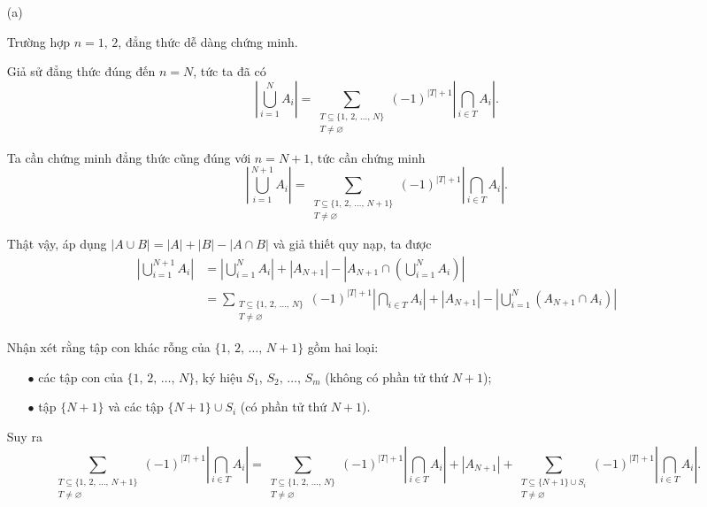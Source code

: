 \begin{enumerate}
    \item[(a)] {
        Trường hợp $n = 1,\,2$, đẳng thức dễ dàng chứng minh.

        Giả sử đẳng thức đúng đến $n = N$, tức ta đã có $$\left|\bigcup\limits_{i = 1}^N A_i\right| = \sum\limits_{\substack{T \subseteq \{1,\,2,\,\ldots,\,N\} \\ T \ne \varnothing}} (-1)^{|T| + 1} \left|\bigcap\limits_{i \in T} A_i\right|.$$

        Ta cần chứng minh đẳng thức cũng đúng với $n = N + 1$, tức cần chứng minh $$\left|\bigcup\limits_{i = 1}^{N+1} A_i\right| = \sum\limits_{\substack{T \subseteq \{1,\,2,\,\ldots,\,N+1\} \\ T \ne \varnothing}} (-1)^{|T| + 1} \left|\bigcap\limits_{i \in T} A_i\right|.$$

        Thật vậy, áp dụng $|A \cup B| = |A| + |B| - |A \cap B|$ và giả thiết quy nạp, ta được
        \begin{align*}
            \left|\bigcup\limits_{i = 1}^{N+1} A_i\right|
            &= \left|\bigcup\limits_{i = 1}^{N} A_i\right| + \left|A_{N+1}\right| - \left|A_{N+1} \cap \left(\bigcup\limits_{i=1}^N A_i\right)\right| \\
            &= \sum\limits_{\substack{T \subseteq \{1,\,2,\,\ldots,\,N\} \\ T \ne \varnothing}} (-1)^{|T| + 1} \left|\bigcap\limits_{i \in T} A_i\right| + \left|A_{N+1}\right| - \left|\bigcup\limits_{i=1}^N\left(A_{N+1} \cap A_i\right)\right|
        \end{align*}

        Nhận xét rằng tập con khác rỗng của $\{1,\,2,\,\ldots,\,N+1\}$ gồm hai loại: 
        \begin{enumerate}
            \item[$\bullet$] các tập con của $\{1,\,2,\,\ldots,\,N\}$, ký hiệu $S_1,\,S_2,\,\ldots,\,S_m$ (không có phần tử thứ $N+1$);
            \item[$\bullet$] tập $\{N+1\}$ và các tập $\{N+1\} \cup S_i$ (có phần tử thứ $N+1$).
        \end{enumerate}

        Suy ra 
        $$\sum\limits_{\substack{T \subseteq \{1,\,2,\,\ldots,\,N+1\} \\ T \ne \varnothing}} (-1)^{|T| + 1} \left|\bigcap\limits_{i \in T} A_i\right| = \sum\limits_{\substack{T \subseteq \{1,\,2,\,\ldots,\,N\} \\ T \ne \varnothing}} (-1)^{|T| + 1} \left|\bigcap\limits_{i \in T} A_i\right| + \left|A_{N+1}\right| + \sum\limits_{\substack{T \subseteq \{N+1\} \cup S_i \\ T \ne \varnothing}} (-1)^{|T| + 1} \left|\bigcap\limits_{i \in T} A_i\right|.$$

}
\end{enumerate}
